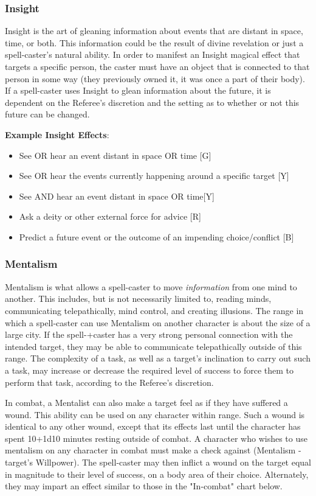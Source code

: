 \documentclass[oneside]{book}
\begin{document}
\begin{multicols}{2}
\subsubsection{Insight}
Insight is the art of gleaning information about events that are distant in space, time, or both. This information could be the result of divine revelation or just a spell-caster's natural ability. In order to manifest an Insight magical effect that targets a specific person, the caster must have an object that is connected to that person in some way (they previously owned it, it was once a part of their body). If a spell-caster uses Insight to glean information about the future, it is dependent on the Referee's discretion and the setting as to whether or not this future can be changed.

\textbf{Example Insight Effects}:
	\begin{itemize}
		\setlength{\itemsep}{0cm}%
  		\setlength{\parskip}{0cm}%
		\item{ \small See OR hear an event distant in space OR time [G]}
		\item{ \small See OR hear the events currently happening around a specific target [Y]}
		\item{ \small See AND hear an event distant in space OR time[Y]}
		\item{ \small Ask a deity or other external force for advice [R]}
		\item{ \small Predict a future event or the outcome of an impending choice/conflict [B]}
	\end{itemize}

\subsubsection{Mentalism}
Mentalism is what allows a spell-caster to move \emph{information} from one mind to another. This includes, but is not necessarily limited to, reading minds, communicating telepathically, mind control, and creating illusions. The range in which a spell-caster can use Mentalism on another character is about the size of a large city. If the spell-+caster has a very strong personal connection with the intended target, they may be able to communicate telepathically outside of this range. The complexity of a task, as well as a target's inclination to carry out such a task, may increase or decrease the required level of success to force them to perform that task, according to the Referee's discretion.

In combat, a Mentalist can also make a target feel as if they have suffered a wound. This ability can be used on any character within range. Such a wound is identical to any other wound, except that its effects last until the character has spent 10+1d10 minutes resting outside of combat. A character who wishes to use mentalism on any character in combat must make a check against (Mentalism - target's Willpower). The spell-caster may then inflict a wound on the target equal in magnitude to their level of success, on a body area of their choice. Alternately, they may impart an effect similar to those in the "In-combat" chart below.  


\end{multicols}
\end{document}
